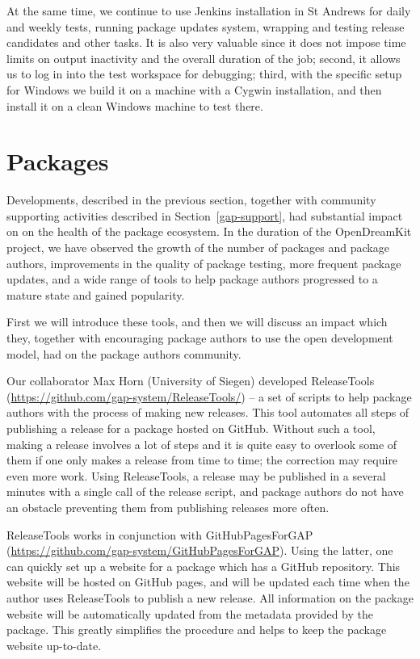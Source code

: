 \documentclass{deliverablereport}
\begin{document}
At the same time, we continue to use Jenkins installation in St Andrews 
for daily and weekly tests, running package updates system, wrapping and
testing release candidates and other tasks. It is also very valuable since 
it does not impose time limits on output inactivity and the overall duration
of the job; second, it allows us to log in into the test workspace for
debugging; third, with the specific \GAP setup for Windows we build it on a
machine with a Cygwin installation, and then install it on a clean Windows
machine to test there. 

\section{\GAP Packages}\label{packages}

Developments, described in the previous section, together with community
supporting activities described in Section~\ref{gap-support}, had substantial
impact on on the health of the package ecosystem. In the duration of the OpenDreamKit
project, we have observed the growth of the number of \GAP packages and package 
authors, improvements in the quality of package testing, more frequent
package updates, and a wide range of tools to help package authors progressed
to a mature state and gained popularity.

First we will introduce these tools, and then we will discuss an impact which
they, together with encouraging package authors to use the open development
model, had on the package authors community.

Our collaborator Max Horn (University of Siegen) developed {\sf ReleaseTools}
(\url{https://github.com/gap-system/ReleaseTools/})
-- a set of scripts to help package authors with the process of making new 
releases. This tool automates all steps of publishing a release for a \GAP package
hosted on GitHub. Without such a tool, making a release involves a lot of steps
and it is quite easy to overlook some of them if one only makes a release from 
time to time; the correction may require even more work. Using {\sf ReleaseTools},
a release may be published in a several minutes with a single call of the release
script, and package authors do not have an obstacle preventing them from publishing
releases more often.

{\sf ReleaseTools} works in conjunction with {\sf GitHubPagesForGAP}
(\url{https://github.com/gap-system/GitHubPagesForGAP}). Using the
latter, one can quickly set up a website for a \GAP package which has
a GitHub repository. This website will be hosted on GitHub pages,
and will be updated each time when the author uses {\sf ReleaseTools}
to publish a new release. All information on the package
website will be automatically updated from the metadata provided by
the package. This greatly simplifies the procedure and helps to keep 
the package website up-to-date.
\end{document}

